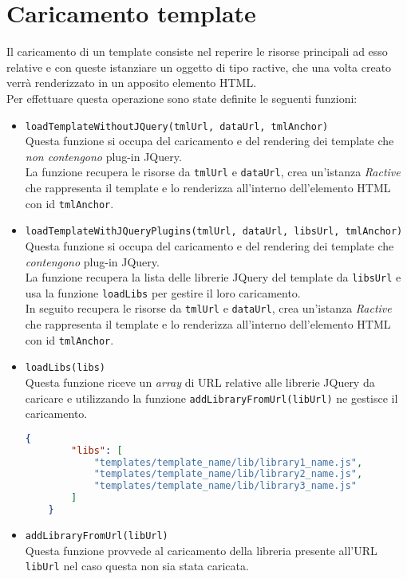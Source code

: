 \section{Caricamento template}
Il caricamento di un template consiste nel reperire le risorse principali ad esso relative e con queste istanziare un oggetto di tipo ractive, che una volta creato verrà renderizzato in un apposito elemento HTML.\\
Per effettuare questa operazione sono state definite le seguenti funzioni:
\begin{itemize}
	\item \texttt{loadTemplateWithoutJQuery(tmlUrl, dataUrl, tmlAnchor)}\\
	Questa funzione si occupa del caricamento e del rendering dei template che \textit{non contengono} plug-in JQuery.\\
	La funzione recupera le risorse da \texttt{tmlUrl} e \texttt{dataUrl}, crea un'istanza \textit{Ractive} che rappresenta il template e lo renderizza all'interno dell'elemento HTML con id \texttt{tmlAnchor}.
	
	\item \texttt{loadTemplateWithJQueryPlugins(tmlUrl, dataUrl, libsUrl, tmlAnchor)}\\
	Questa funzione si occupa del caricamento e del rendering dei template che \textit{contengono} plug-in JQuery.\\
	La funzione recupera la lista delle librerie JQuery del template da \texttt{libsUrl} e usa la funzione \texttt{loadLibs} per gestire il loro caricamento.\\
	In seguito recupera le risorse da \texttt{tmlUrl} e \texttt{dataUrl}, crea un'istanza \textit{Ractive} che rappresenta il template e lo renderizza all'interno dell'elemento HTML con id \texttt{tmlAnchor}.
	
	\newpage
	\item \texttt{loadLibs(libs)}\\
	Questa funzione riceve un \textit{array} di URL relative alle librerie JQuery da caricare e utilizzando la funzione \texttt{addLibraryFromUrl(libUrl)} ne gestisce il caricamento.
	\begin{lstlisting}[language=JSON, caption=Esempio array \texttt{libs}.]
	{
		"libs": [
			"templates/template_name/lib/library1_name.js",
			"templates/template_name/lib/library2_name.js",
			"templates/template_name/lib/library3_name.js"
		]
	}
	\end{lstlisting}
	
	\item \texttt{addLibraryFromUrl(libUrl)}\\
	Questa funzione provvede al caricamento della libreria presente all'URL \texttt{libUrl} nel caso questa non sia stata caricata.
	
\end{itemize}
